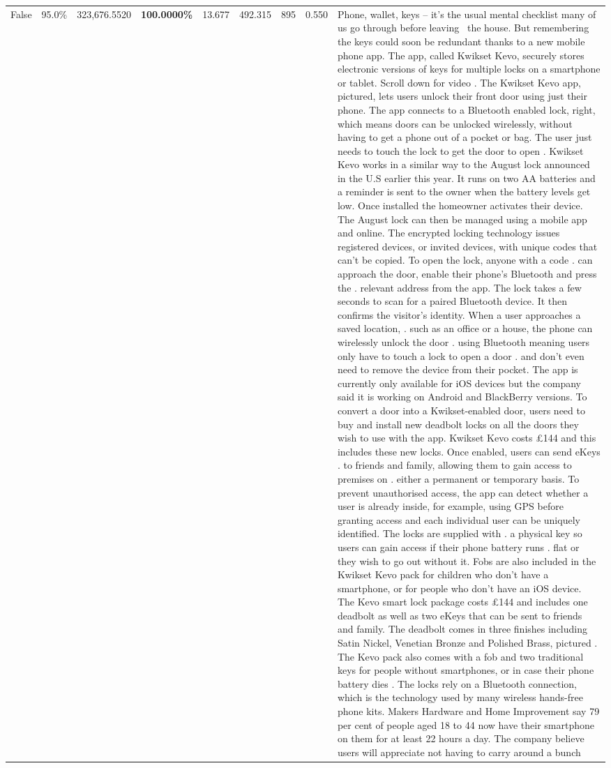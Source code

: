 \begin{table}[H]
\begin{tabular}{lllrlllll}
False & 95.0\% & 323,676.5520 & \bfseries \color{red} 100.0000\% & 13.677 & 492.315 & 895 & 0.550 & Phone, wallet, keys – it’s the usual mental checklist many of us go through before leaving  the house. But remembering the keys could soon be redundant thanks to a new mobile phone app. The app, called Kwikset Kevo, securely stores electronic versions of keys for multiple locks on a smartphone or tablet. Scroll down for video . The Kwikset Kevo app, pictured, lets users unlock their front door using just their phone. The app connects to a Bluetooth enabled lock, right, which means doors can be unlocked wirelessly, without having to get a phone out of a pocket or bag. The user just needs to touch the lock to get the door to open . Kwikset Kevo works in a similar way to the August lock announced in the U.S earlier this year. It runs on two AA batteries and a reminder is sent to the owner when the battery levels get low. Once installed the homeowner activates their device. The August lock can then be managed using a mobile app and online. The encrypted locking technology issues registered devices, or invited devices, with unique codes that can't be copied. To open the lock, anyone with a code . can approach the door, enable their phone's Bluetooth and press the . relevant address from the app. The lock takes a few seconds to scan for a paired Bluetooth device. It then confirms the visitor's identity. When a user approaches a saved location, . such as an office or a house, the phone can wirelessly unlock the door . using Bluetooth meaning users only have to touch a lock to open a door . and don't even need to remove the device from their pocket. The app is currently only available for iOS devices but the company said it is working on Android and BlackBerry versions. To convert a door into a Kwikset-enabled door, users need to buy and install new deadbolt locks on all the doors they wish to use with the app. Kwikset Kevo costs £144 and this includes these new locks. Once enabled, users can send eKeys . to friends and family, allowing them to gain access to premises on . either a permanent or temporary basis. To prevent unauthorised access, the app can detect whether a user is already inside, for example, using GPS before granting access and each individual user can be uniquely identified. The locks are supplied with . a physical key so users can gain access if their phone battery runs . flat or they wish to go out without it. Fobs are also included in the Kwikset Kevo pack for children who don't have a smartphone, or for people who don't have an iOS device. The Kevo smart lock package costs £144 and includes one deadbolt as well as two eKeys that can be sent to friends and family. The deadbolt comes in three finishes including Satin Nickel, Venetian Bronze and Polished Brass, pictured . The Kevo pack also comes with a fob and two traditional keys for people without smartphones, or in case their phone battery dies . The locks rely on a Bluetooth connection, which is the technology used by many wireless hands-free phone kits. Makers Hardware and Home Improvement say 79 per cent of people aged 18 to 44 now have their smartphone on them for at least 22 hours a day. The company believe users will appreciate not having to carry around a bunch 
\end{tabular}
\end{table}
